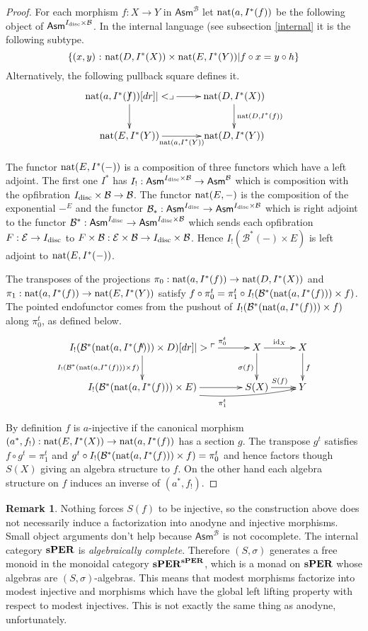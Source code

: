 \documentclass{amsart}
\theoremstyle{plain}
\theoremstyle{definition}
\newtheorem{remark}[theorem]{Remark}
\newcommand\cat\mathcal
\newcommand\set[1]{\left\{#1\right\}}
\newcommand\id{\mathrm{id}}
\newcommand\ri{^*}
\newcommand\Asm{\mathsf{Asm}}
\begin{document}
\begin{proof}
For each morphism $f:X\to Y$ in $\Asm^{\cat B}$ let $\nat(a,I\ri (f))$ be the following object of $\Asm^{I\disc\times \cat B}$. In the internal language (see subsection \ref{internal} it is the following subtype.
\[ \set{(x,y)\of \nat(D,I\ri(X))\times \nat(E,I\ri(Y))| f\circ x = y\circ h } \]
Alternatively, the following pullback square defines it. 
\[\xymatrix{
\nat(a,I\ri(f)) \ar[r]\ar[d]\pb & \nat(D,I\ri(X)) \ar[d]^{\nat(D,I\ri(f))}\\
\nat(E,I\ri(Y)) \ar[r]_{\nat(a,I\ri(Y))} & \nat(D,I\ri(Y))
}\]

The functor $\mathrm{nat}(E,I^*(-))$ is a composition of three functors which have a left adjoint. The first one $I^*$ has $I_!:\Asm^{I\disc\times \cat B}\to \Asm^{\cat B}$ which is composition with the opfibration $I\disc\times \cat B\to \cat B$. The functor $\mathrm{nat}(E,-)$ is the composition of the exponential $-^E$ and the functor $\cat B_*:\Asm^{I\disc}\to\Asm^{I\disc\times \cat B}$ which is right adjoint to the functor $\cat B\ri:\Asm^{I\disc}\to\Asm^{I\disc\times \cat B}$ which sends each opfibration $F:\cat E\to I\disc$ to $F\times\cat B:\cat E\times\cat B\to I\disc\times\cat B$. Hence $I_!(\cat B^*(-)\times E)$ is left adjoint to $\mathrm{nat}(E,I^*(-))$.

The transposes of the projections $\pi_0: \nat(a,I\ri (f))\to \nat(D,I\ri(X))$ and $\pi_1:\nat(a,I\ri (f))\to \nat(E,I\ri(Y))$ satisfy $f\circ \pi_0^t = \pi_1^t\circ I_!(\cat B^*(\nat(a,I\ri (f)))\times f)$. The pointed endofunctor comes from the pushout of $I_!(\cat B^*(\nat(a,I\ri (f)))\times f)$ along $\pi_0^t$, as defined below.
\[ \xymatrix{
I_!(\cat B^*(\nat(a,I\ri (f)))\times D) \ar[r]^(.7){\pi_0^t} \ar[d]_{I_!(\cat B^*(\nat(a,I\ri (f)))\times f)}\po &
X \ar[r]^{\id_X}\ar[d]_{\sigma(f)} & X \ar[d]^f \\
I_!(\cat B^*(\nat(a,I\ri (f)))\times E) \ar[r] \ar@/_2ex/[rr]_{\pi_1^t} & S(X) \ar[r]^{S(f)} &  Y 
}\]

By definition $f$ is $a$-injective if the canonical morphism $(a^*,f_!):\nat(E,I\ri(X))\to \nat(a,I\ri(f))$ has a section $g$. The transpose $g^t$ satisfies $f\circ g^t = \pi_1^t$ and $g^t\circ I_!(\cat B^*(\nat(a,I\ri (f)))\times f) = \pi_0^t$ and hence factors though $S(X)$ giving an algebra structure to $f$. On the other hand each algebra structure on $f$ induces an inverse of $(a^*,f_!)$.
\end{proof}

\begin{remark} Nothing forces $S(f)$ to be injective, so the construction above does not necessarily induce a factorization into anodyne and injective morphisms. Small object arguments don't help because $\Asm^{\cat B}$ is not cocomplete. The internal category $\mathbf{s}\mathbf{PER}$ is \emph{algebraically complete}\cite{Freyd91}. Therefore $(S,\sigma)$ generates a free monoid in the monoidal category $\mathbf{s}\mathbf{PER}^{\mathbf{s}\mathbf{PER}}$, which is a monad on $\mathbf{s}\mathbf{PER}$ whose algebras are $(S,\sigma)$-algebras. This means that modest morphisms factorize into modest injective and morphisms which have the global left lifting property with respect to modest injectives. This is not exactly the same thing as anodyne, unfortunately. \label{modfac}
\end{remark}
\end{document}
